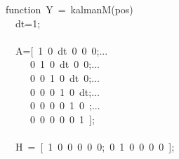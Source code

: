 \documentclass{article}\usepackage[]{graphicx}\usepackage[]{xcolor}
\makeatletter
\newcommand{\hlnum}[1]{\textcolor[rgb]{0.863,0.196,0.184}{#1}}%
\newcommand{\hlopt}[1]{\textcolor[rgb]{0.576,0.631,0.631}{#1}}%
\newcommand{\hldef}[1]{\textcolor[rgb]{0.514,0.58,0.588}{#1}}%
\newcommand{\hlkwa}[1]{\textcolor[rgb]{0.796,0.294,0.086}{#1}}%
\newenvironment{kframe}{%
 \def\at@end@of@kframe{}%
 \ifinner\ifhmode%
  \def\at@end@of@kframe{\end{minipage}}%
  \begin{minipage}{\columnwidth}%
 \fi\fi%
 \def\FrameCommand##1{\hskip\@totalleftmargin \hskip-\fboxsep
 \colorbox{shadecolor}{##1}\hskip-\fboxsep
     \hskip-\linewidth \hskip-\@totalleftmargin \hskip\columnwidth}%
 \MakeFramed {\advance\hsize-\width
   \@totalleftmargin\z@ \linewidth\hsize
   \@setminipage}}%
 {\par\unskip\endMakeFramed%
 \at@end@of@kframe}
\newenvironment{knitrout}{}{} %
\makeatother
\begin{document}
\begin{knitrout}
\color{fgcolor}\begin{kframe}
\noindent
\ttfamily
\hldef{}\hlkwa{function\ }\hldef{Y\ }\hlopt{=\ }\hldef{kalmanM}\hlopt{(}\hldef{pos}\hlopt{)}\hspace*{\fill}\\
\hldef{}\hldef{\ \ }\hldef{dt}\hlopt{=}\hldef{}\hlnum{1}\hldef{}\hlopt{;}\hspace*{\fill}\\
\hldef{}\hldef{\ \ }\hldef{}\hspace*{\fill}\\
\hldef{}\hldef{\ \ }\hldef{A}\hlopt{={[}\ }\hldef{}\hlnum{1\ 0\ }\hldef{dt\ }\hlnum{0\ 0\ 0}\hldef{}\hlopt{;}\hldef{...}\hldef{\ \ \ \ \ }\hldef{}\hlslc{\%\ {[}x}\hldef{\ \ }\hlslc{{]}}\hspace*{\fill}\\
\hldef{}\hldef{\ \ \ \ \ }\hldef{}\hlnum{0\ 1\ 0\ }\hldef{dt\ }\hlnum{0\ 0}\hldef{}\hlopt{;}\hldef{...}\hldef{\ \ \ \ \ }\hldef{}\hlslc{\%\ {[}y}\hldef{\ \ }\hlslc{{]}}\hspace*{\fill}\\
\hldef{}\hldef{\ \ \ \ \ }\hldef{}\hlnum{0\ 0\ 1\ 0\ }\hldef{dt\ }\hlnum{0}\hldef{}\hlopt{;}\hldef{...}\hldef{\ \ \ \ \ }\hldef{}\hlslc{\%\ {[}Vx{]}}\hspace*{\fill}\\
\hldef{}\hldef{\ \ \ \ \ }\hldef{}\hlnum{0\ 0\ 0\ 1\ 0\ }\hldef{dt}\hlopt{;}\hldef{...}\hldef{\ \ \ \ \ }\hldef{}\hlslc{\%\ {[}Vy{]}}\hspace*{\fill}\\
\hldef{}\hldef{\ \ \ \ \ }\hldef{}\hlnum{0\ 0\ 0\ 0\ 1\ 0\ }\hldef{}\hlopt{;}\hldef{...}\hldef{\ \ \ \ \ }\hldef{}\hlslc{\%\ {[}Ax{]}}\hspace*{\fill}\\
\hldef{}\hldef{\ \ \ \ \ }\hldef{}\hlnum{0\ 0\ 0\ 0\ 0\ 1\ }\hldef{}\hlopt{{]};}\hldef{\ \ \ \ \ \ \ }\hlopt{}\hldef{}\hlslc{\%\ {[}Ay{]}}\hspace*{\fill}\\
\hldef{}\hldef{\ \ }\hldef{}\hspace*{\fill}\\
\hldef{}\hldef{\ \ }\hldef{H\ }\hlopt{=\ {[}\ }\hldef{}\hlnum{1\ 0\ 0\ 0\ 0\ 0}\hldef{}\hlopt{;\ }\hldef{}\hlnum{0\ 1\ 0\ 0\ 0\ 0\ }\hldef{}\hlopt{{]};}\hspace*{\fill}\\

\end{kframe}
\end{knitrout}
\end{document}
